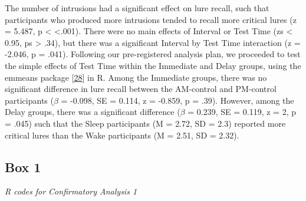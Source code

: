 \documentclass[
]{article}
\begin{document}
The number of intrusions had a significant effect on lure recall, such that participants who produced more intrusions tended to recall more critical lures (z = 5.487, p \textless{} \textless.001). There were no main effects of Interval or Test Time (zs \textless{} 0.95, ps \textgreater{} .34), but there was a significant Interval by Test Time interaction (z = -2.046, p = .041). Following our pre-registered analysis plan, we proceeded to test the simple effects of Test Time within the Immediate and Delay groups, using the emmeans package {[}\protect\hyperlink{ref-lenth2021a}{28}{]} in R. Among the Immediate groups, there was no significant difference in lure recall between the AM-control and PM-control participants (\(\beta\) = -0.098, SE = 0.114, z = -0.859, p = .39). However, among the Delay groups, there was a significant difference (\(\beta\) = 0.239, SE = 0.119, z = 2, p = .045) such that the Sleep participants (M = 2.72, SD = 2.3) reported more critical lures than the Wake participants (M = 2.51, SD = 2.32).

\hypertarget{box-1}{%
\subsection*{Box 1}\label{box-1}}

\emph{R codes for Confirmatory Analysis 1}
\end{document}
